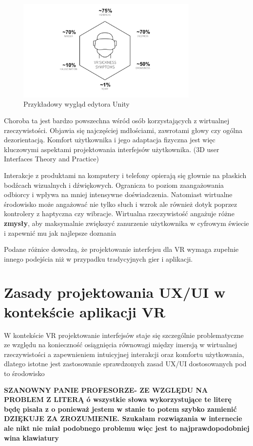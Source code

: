 \begin{figure}[!htb]
    \centering
    \includegraphics[width=0.8\textwidth]{images/VRSICK.png}
    \caption{Przykładowy wygląd edytora Unity}
    \label{unity_engine_example}
\end{figure}

Choroba ta jest bardzo powszechna wśród osób korzystających z wirtualnej rzeczywistości. Objawia się najczęściej mdłościami, zawrotami głowy czy ogólna dezorientacją. \textbf{}{Komfort użytkownika i jego adaptacja fizyczna} jest więc kluczowymi aspektami projektowania interfejsów użytkownika. (3D user Interfaces Theory and Practice)

Interakcje z produktami na komputery i telefony opierają się głownie na płaskich bodźcach wizualnych i dźwiękowych. Ogranicza to poziom zaangażowania odbiorcy i wpływa na mniej intensywne doświadczenia. Natomiast wirtualne środowisko może angażować nie tylko słuch i wzrok ale również dotyk poprzez kontrolery z haptyczna czy wibracje. Wirtualna rzeczywistość angażuje różne \textbf{zmysły}, aby maksymalnie zwiększyć zanurzenie użytkownika w cyfrowym świecie i zapewnić mu jak najlepsze doznania
 
Podane różnice dowodzą, że projektowanie interfejsu dla VR wymaga zupełnie innego podejścia niż w przypadku tradycyjnych gier i aplikacji. 


\section{Zasady  projektowania UX/UI w kontekście aplikacji VR}

W kontekście VR projektowanie interfejsów staje się szczególnie problematyczne ze względu na konieczność osiągnięcia równowagi między imersją w wirtualnej rzeczywistości a zapewnieniem intuicyjnej interakcji oraz komfortu użytkowania, dlatego istotne jest zastosowanie sprawdzonych zasad UX/UI dostosowanych pod to środowisko



\textbf{
SZANOWNY PANIE PROFESORZE- ZE WZGLĘDU NA PROBLEM Z LITERĄ ó wszystkie słowa wykorzystujące te literę będę pisała z o ponieważ jestem w stanie to potem szybko zamienić 
DZIĘKUJE ZA ZROZUMIENIE. 
Szukałam rozwiązania w internecie ale nikt nie miał podobnego problemu więc jest to najprawdopodobniej wina klawiatury}
